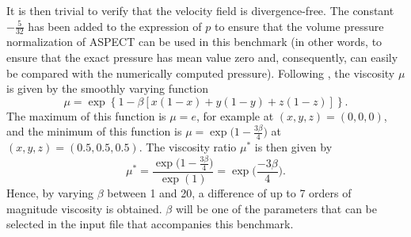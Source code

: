 \documentclass{article}
\newcommand{\aspect}{\textsc{ASPECT}}
\begin{document}
It is then trivial to verify that the velocity field is divergence-free. The
constant $-\frac{5}{32}$ has been added to the expression of $p$ to ensure
that the volume pressure normalization of \aspect{} can be used in this
benchmark (in other words, to ensure that the exact pressure has mean value
zero and, consequently, can easily be compared with the numerically computed
pressure). Following \cite{busa13}, the viscosity $\mu$ is given by the smoothly varying function 
\begin{equation}
  \mu = \exp\left\{1 - \beta\left[x (1-x) + y(1-y) + z(1-z)\right]\right\}.
  \label{eq:burstedde-mu}
\end{equation}
The maximum of this function is $\mu = e$, for example at $(x,y,z)=(0,0,0)$, and the minimum of this function is $\mu = \exp \Big( 1-\frac{3\beta}{4}\Big)$ at $(x,y,z) = (0.5,0.5,0.5)$. The viscosity ratio $\mu^\ast$ is then given by 
\begin{equation}
  \mu^\ast = \frac{\exp\Big(1-\frac{3\beta}{4}\Big)}{\exp(1)} = \exp\Big(\frac{-3\beta}{4}\Big).
\end{equation}
Hence, by varying $\beta$ between 1 and 20, a difference of up to 7 orders of
magnitude viscosity is obtained. $\beta$ will be one of the parameters that
can be selected in the input file that accompanies this benchmark.
\end{document}
